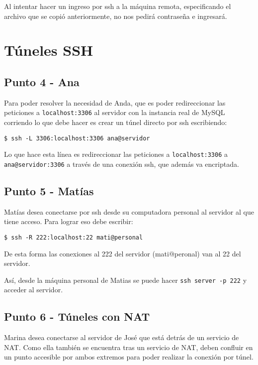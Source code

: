 Al intentar hacer un ingreso por ssh a la máquina remota, especificando el archivo que se copió anteriormente, no nos pedirá contraseña e ingresará.

\section*{Túneles SSH}

\subsection*{Punto 4 - Ana}

Para poder resolver la necesidad de Anda, que es poder redireccionar las peticiones a \texttt{localhost:3306} al servidor con la instancia real de MySQL corriendo lo que debe hacer es crear un túnel directo por ssh escribiendo: 

\begin{lstlisting}
$ ssh -L 3306:localhost:3306 ana@servidor 
\end{lstlisting}

Lo que hace esta línea es redireccionar las peticiones a \texttt{localhost:3306} a \texttt{ana@servidor:3306} a través de una conexión ssh, que además va encriptada.

\subsection*{Punto 5 - Matías}

Matías desea conectarse por ssh desde su computadora personal al servidor al que tiene acceso. Para lograr eso debe escribir:

\begin{lstlisting}
$ ssh -R 222:localhost:22 mati@personal
\end{lstlisting}

De esta forma las conexiones al 222 del servidor (mati@peronal) van al 22 del servidor.

Así, desde la máquina personal de Matias se puede hacer \texttt{ssh server -p 222} y acceder al servidor.

\subsection*{Punto 6 - Túneles con NAT}

Marina desea conectarse al servidor de José que está detrás de un servicio de NAT. Como ella también se encuentra tras un servicio de NAT, deben confluir en un punto accesible por ambos extremos para poder realizar la conexión por túnel.

